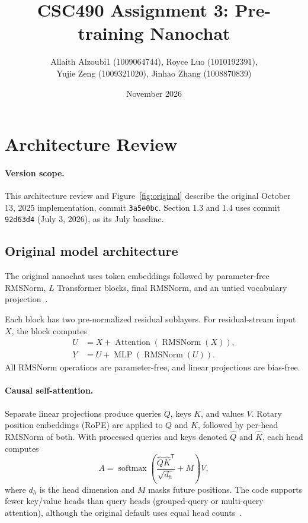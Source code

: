 \documentclass[11pt]{article}
\title{CSC490 Assignment 3: Pre-training Nanochat}
\author{Allaith Alzoubi1 (1009064744), Royce Luo (1010192391), \\ Yujie Zeng  (1009321020), 
    Jinhao Zhang (1008870839)}
\date{November 2026}
\begin{document}
\maketitle

\section{Architecture Review}

\paragraph{Version scope.}
This architecture review and Figure~\ref{fig:original} describe the original
October 13, 2025 implementation, commit \texttt{3a5e0bc}. Section 1.3 and 1.4 uses commit \texttt{92d63d4} (July 3, 2026), as its July baseline.

\subsection{Original model architecture}
The original nanochat uses token embeddings followed by parameter-free RMSNorm, \(L\) Transformer blocks, final RMSNorm, and an untied vocabulary projection~\cite{nanochat-code}.

Each block has two pre-normalized residual sublayers. For residual-stream
input $X$, the block computes
\begin{align}
 U &= X + \operatorname{Attention}(\operatorname{RMSNorm}(X)),\\
 Y &= U + \operatorname{MLP}(\operatorname{RMSNorm}(U)).
\end{align}
All RMSNorm operations are parameter-free, and linear projections are bias-free.

\paragraph{Causal self-attention.}
Separate linear projections produce queries $Q$, keys $K$, and values $V$.
Rotary position embeddings (RoPE) are applied to $Q$ and $K$, followed by
per-head RMSNorm of both. With
processed queries and keys denoted $\widehat Q$ and $\widehat K$, each head
computes
\begin{equation}
 A = \operatorname{softmax}\!\left(
 \frac{\widehat Q\widehat K^{\mathsf T}}{\sqrt{d_h}}+M
 \right)V,
\end{equation}
where $d_h$ is the head dimension and $M$ masks future positions. The code supports fewer key/value
heads than query heads (grouped-query or multi-query attention), although
the original default uses equal head counts~\cite{nanochat-code}.
\end{document}
